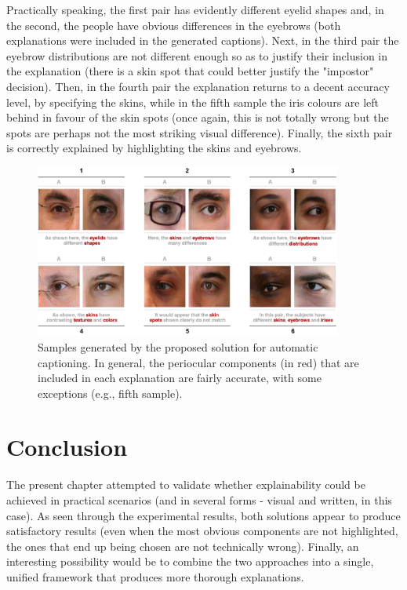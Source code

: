 Practically speaking, the first pair has evidently different eyelid shapes and, in the second, the people have obvious differences in the eyebrows (both explanations were included in the generated captions). Next, in the third pair the eyebrow distributions are not different enough so as to justify their inclusion in the explanation (there is a skin spot that could better justify the "impostor" decision). Then, in the fourth pair the explanation returns to a decent accuracy level, by specifying the skins, while in the fifth sample the iris colours are left behind in favour of the skin spots (once again, this is not totally wrong but the spots are perhaps not the most striking visual difference). Finally, the sixth pair is correctly explained by highlighting the skins and eyebrows.

\begin{figure}[H]
  \begin{center}
  \includegraphics[width=0.90\textwidth]{figures/figure_41.pdf}
  \caption{Samples generated by the proposed solution for automatic captioning. In general, the periocular components (in red) that are included in each explanation are fairly accurate, with some exceptions (e.g., fifth sample).}
  \label{fig:caption_samples}
  \end{center}
\end{figure}

\section{Conclusion}
\label{sec:chap4_conclusion}

The present chapter attempted to validate whether explainability could be achieved in practical scenarios (and in several forms - visual and written, in this case). As seen through the experimental results, both solutions appear to produce satisfactory results (even when the most obvious components are not highlighted, the ones that end up being chosen are not technically wrong). Finally, an interesting possibility would be to combine the two approaches into a single, unified framework that produces more thorough explanations.